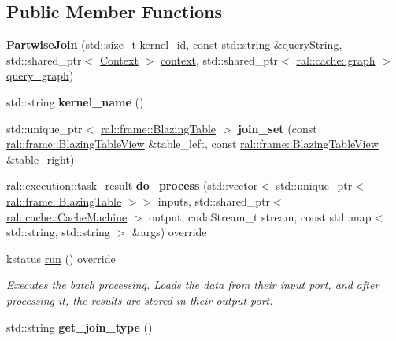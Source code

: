 \subsection*{Public Member Functions}
\begin{DoxyCompactItemize}
\item 
\mbox{\label{classral_1_1batch_1_1PartwiseJoin_ad15fea0e0f32803fb619afb78bd91fb0}} 
{\bfseries Partwise\+Join} (std\+::size\+\_\+t \hyperlink{classral_1_1cache_1_1kernel_a2fd708656cb056a41ec635b8bdc4acfe}{kernel\+\_\+id}, const std\+::string \&query\+String, std\+::shared\+\_\+ptr$<$ \hyperlink{classblazingdb_1_1manager_1_1Context}{Context} $>$ \hyperlink{classral_1_1cache_1_1kernel_af0347d14d678cfa7205c1387746a2e1b}{context}, std\+::shared\+\_\+ptr$<$ \hyperlink{classral_1_1cache_1_1graph}{ral\+::cache\+::graph} $>$ \hyperlink{classral_1_1cache_1_1kernel_a5fbb02292aff165a28ef25e75f0d89bd}{query\+\_\+graph})
\item 
\mbox{\label{classral_1_1batch_1_1PartwiseJoin_ae50d33e2d47aedd99023b2bd8ed76d15}} 
std\+::string {\bfseries kernel\+\_\+name} ()
\item 
\mbox{\label{classral_1_1batch_1_1PartwiseJoin_a65b666d45481983a7227b1d8d6163e37}} 
std\+::unique\+\_\+ptr$<$ \hyperlink{classral_1_1frame_1_1BlazingTable}{ral\+::frame\+::\+Blazing\+Table} $>$ {\bfseries join\+\_\+set} (const \hyperlink{classral_1_1frame_1_1BlazingTableView}{ral\+::frame\+::\+Blazing\+Table\+View} \&table\+\_\+left, const \hyperlink{classral_1_1frame_1_1BlazingTableView}{ral\+::frame\+::\+Blazing\+Table\+View} \&table\+\_\+right)
\item 
\mbox{\label{classral_1_1batch_1_1PartwiseJoin_a1856e0bd8819360cd9a1f22bf00a6665}} 
\hyperlink{structral_1_1execution_1_1task__result}{ral\+::execution\+::task\+\_\+result} {\bfseries do\+\_\+process} (std\+::vector$<$ std\+::unique\+\_\+ptr$<$ \hyperlink{classral_1_1frame_1_1BlazingTable}{ral\+::frame\+::\+Blazing\+Table} $>$$>$ inputs, std\+::shared\+\_\+ptr$<$ \hyperlink{classral_1_1cache_1_1CacheMachine}{ral\+::cache\+::\+Cache\+Machine} $>$ output, cuda\+Stream\+\_\+t stream, const std\+::map$<$ std\+::string, std\+::string $>$ \&args) override
\item 
kstatus \hyperlink{classral_1_1batch_1_1PartwiseJoin_a280aee308eff9e14f239cdce229c4035}{run} () override
\begin{DoxyCompactList}\small\item\em Executes the batch processing. Loads the data from their input port, and after processing it, the results are stored in their output port. \end{DoxyCompactList}\item 
\mbox{\label{classral_1_1batch_1_1PartwiseJoin_a8c9093412bff138b565d956ee660e978}} 
std\+::string {\bfseries get\+\_\+join\+\_\+type} ()
\end{DoxyCompactItemize}
